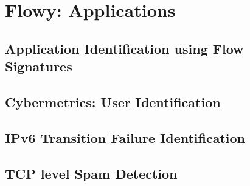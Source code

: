 \chapter{Flowy: Applications}\label{ch:flowy-applications}

\section{Application Identification using Flow 
Signatures}\label{sec:application-signatures}
\section{Cybermetrics: User Identification}\label{sec:cybermetrics}
\section{IPv6 Transition Failure Identification}\label{sec:ipv6transeval}
\section{TCP level Spam Detection}\label{sec:spam-detection}